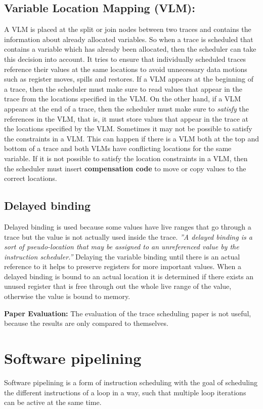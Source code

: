 \documentclass[a4paper,10pt]{article}
\begin{document}
\subsection{Variable Location Mapping (VLM):}
A VLM is placed at the split or join nodes between two traces and contains the information about already allocated variables. So when a
trace is scheduled that contains a variable which has already been allocated, then the scheduler can take this decision into account. It
tries to ensure that individually scheduled traces reference their values at the same locations to avoid unnecessary data motions such as
register moves, spills and restores. If a VLM appears at the beginning of a trace, then the scheduler must make sure to read values that
appear in the trace from the locations specified in the VLM. On the other hand, if a VLM appears at the end of a trace, then the
scheduler must make sure to \textit{satisfy} the references in the VLM, that is, it must store values that appear in the trace at the
locations specified by the VLM. Sometimes it may not be possible to satisfy the constraints in a VLM. This can happen if there is a VLM
both at the top and bottom of a trace and both VLMs have conflicting locations for the same variable. If it is not possible to satisfy
the location constraints in a VLM, then the scheduler must insert \textbf{compensation code} to move or copy values to the correct
locations.

\subsection{Delayed binding}
Delayed binding is used because some values have live ranges that go through a trace but the value is not actually used inside the
trace. \textit{''A delayed binding is a sort of pseudo-location that may be assigned to an unreferenced value by the instruction
scheduler.''} Delaying the variable binding until there is an actual reference to it helps to preserve registers for more important
values. When a delayed binding is bound to an actual location it is determined if there exists an unused register that is free through out
the whole live range of the value, otherwise the value is bound to memory.

\textbf{Paper Evaluation:} The evaluation of the trace scheduling paper is not useful, because the results are only compared to
themselves.

\section{Software pipelining}
Software pipelining is a form of instruction scheduling with the goal of scheduling the different instructions of a loop in a way, such
that multiple loop iterations can be active at the same time.
\end{document}
